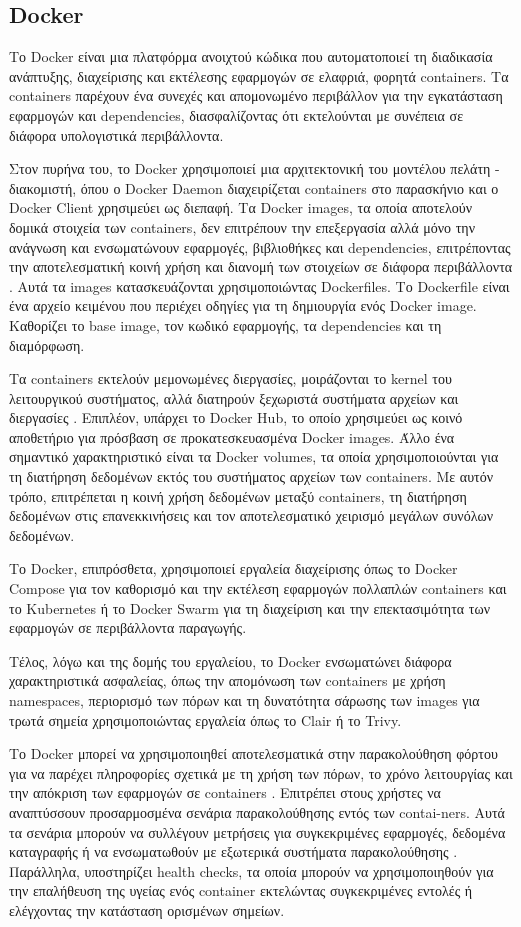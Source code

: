 \subsection{Docker}
\label{subsec:docker}

Το Docker είναι μια πλατφόρμα ανοιχτού κώδικα που αυτοματοποιεί τη διαδικασία ανάπτυξης, διαχείρισης και εκτέλεσης εφαρμογών σε ελαφριά, φορητά containers. Τα containers παρέχουν ένα συνεχές και απομονωμένο περιβάλλον για την εγκατάσταση εφαρμογών και dependencies, διασφαλίζοντας ότι εκτελούνται με συνέπεια σε διάφορα υπολογιστικά περιβάλλοντα.

Στον πυρήνα του, το Docker χρησιμοποιεί μια αρχιτεκτονική του μοντέλου πελάτη - διακομιστή, όπου ο Docker Daemon διαχειρίζεται containers στο παρασκήνιο και ο Docker Client χρησιμεύει ως διεπαφή. Τα Docker images, τα οποία αποτελούν δομικά στοιχεία των containers, δεν επιτρέπουν την επεξεργασία αλλά μόνο την ανάγνωση και ενσωματώνουν εφαρμογές, βιβλιοθήκες και dependencies, επιτρέποντας την αποτελεσματική κοινή χρήση και διανομή των στοιχείων σε διάφορα περιβάλλοντα \cite{docker2}. Αυτά τα images κατασκευάζονται χρησιμοποιώντας Dockerfiles. Το Dockerfile είναι ένα αρχείο κειμένου που περιέχει οδηγίες για τη δημιουργία ενός Docker image. Καθορίζει το base image, τον κωδικό εφαρμογής, τα dependencies και τη διαμόρφωση.

Τα containers εκτελούν μεμονωμένες διεργασίες, μοιράζονται το kernel του λειτουργικού συστήματος, αλλά διατηρούν ξεχωριστά συστήματα αρχείων και διεργασίες \cite{docker1}. Επιπλέον, υπάρχει το Docker Hub, το οποίο χρησιμεύει ως κοινό αποθετήριο για πρόσβαση σε προκατεσκευασμένα Docker images. Άλλο ένα σημαντικό χαρακτηριστικό είναι τα Docker volumes, τα οποία χρησιμοποιούνται για τη διατήρηση δεδομένων εκτός του συστήματος αρχείων των containers. Με αυτόν τρόπο, επιτρέπεται η κοινή χρήση δεδομένων μεταξύ containers, τη διατήρηση δεδομένων στις επανεκκινήσεις και τον αποτελεσματικό χειρισμό μεγάλων συνόλων δεδομένων.

Το Docker, επιπρόσθετα, χρησιμοποιεί εργαλεία διαχείρισης όπως το Docker Compose για τον καθορισμό και την εκτέλεση εφαρμογών πολλαπλών containers και το Kubernetes ή το Docker Swarm για τη διαχείριση και την επεκτασιμότητα των εφαρμογών σε περιβάλλοντα παραγωγής.

Τέλος, λόγω και της δομής του εργαλείου, το Docker ενσωματώνει διάφορα χαρακτηριστικά ασφαλείας, όπως την απομόνωση των containers με χρήση namespaces, περιορισμό των πόρων και τη δυνατότητα σάρωσης των images για τρωτά σημεία χρησιμοποιώντας εργαλεία όπως το Clair ή το Trivy.

Το Docker μπορεί να χρησιμοποιηθεί αποτελεσματικά στην παρακολούθηση φόρτου για να παρέχει πληροφορίες σχετικά με τη χρήση των πόρων, το χρόνο λειτουργίας και την απόκριση των εφαρμογών σε containers \cite{docker3}. Επιτρέπει στους χρήστες να αναπτύσσουν προσαρμοσμένα σενάρια παρακολούθησης εντός των contai\hyp{}ners. Αυτά τα σενάρια μπορούν να συλλέγουν μετρήσεις για συγκεκριμένες εφαρμογές, δεδομένα καταγραφής ή να ενσωματωθούν με εξωτερικά συστήματα παρακολούθησης \cite{docker3}. Παράλληλα, υποστηρίζει health checks, τα οποία μπορούν να χρησιμοποιηθούν για την επαλήθευση της υγείας ενός container εκτελώντας συγκεκριμένες εντολές ή ελέγχοντας την κατάσταση ορισμένων σημείων.
